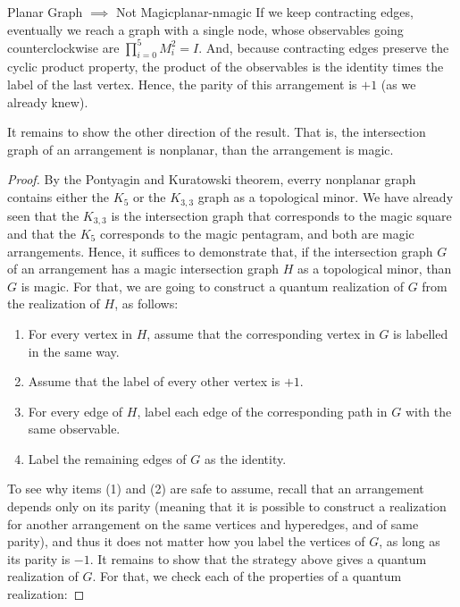 \documentclass{llncs}
\begin{document}
\begin{tcbexample}{Planar Graph \(\implies\) Not Magic}{planar-nmagic}
  If we keep contracting edges, eventually we reach a graph with a
  single node, whose observables going counterclockwise are
  \(\prod_{i = 0}^{5} M_{i}^{2} = I\). And, because contracting edges
  preserve the cyclic product property, the product of the observables is the
  identity times the label of the last vertex. Hence, the parity of
  this arrangement is \(+1\) (as we already knew).
\end{tcbexample}

It remains to show the other direction of the result. That is, the
intersection graph of an arrangement is nonplanar, than the
arrangement is magic.

\begin{proof}
  By the Pontyagin and Kuratowski theorem, everry nonplanar graph contains either
  the \(K_{5}\) or the \(K_{3,3}\) graph as a topological minor. We have already seen
  that the \(K_{3, 3}\) is the intersection graph that corresponds to the magic square
  and that the \(K_{5}\) corresponds to the magic pentagram, and both are magic
  arrangements. Hence, it suffices to demonstrate that, if the intersection graph
  \(G\) of an arrangement has a magic intersection graph \(H\) as a topological minor,
  than \(G\) is magic. For that, we are going to construct a quantum realization
  of \(G\) from the realization of \(H\), as follows:

  \begin{enumerate}
  \item For every vertex in \(H\), assume that the corresponding vertex in
    \(G\) is labelled in the same way.
    
  \item Assume that the label of every other vertex is \(+1\).
    
  \item For every edge of \(H\), label each edge of the corresponding  path in \(G\) with
    the same observable.

  \item Label the remaining edges of \(G\) as the identity.
  \end{enumerate}

  To see why items (1) and (2) are safe to assume, recall that an
  arrangement depends only on its parity (meaning that it is possible
  to construct a realization for another arrangement on the same
  vertices and hyperedges, and of same parity), and thus it does not
  matter how you label the vertices of \(G\), as long as its parity
  is \(-1\). It remains to show that the strategy above gives a
  quantum realization of \(G\). For that, we check each of the
  properties of a quantum realization:


\end{proof}
\end{document}
